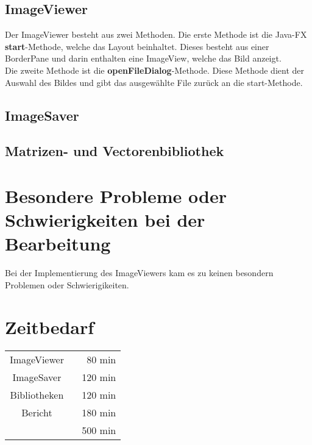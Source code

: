 \documentclass[a4paper,10pt]{ltxdoc}
\begin{document}
\subsection{ImageViewer}
Der ImageViewer besteht aus zwei Methoden. Die erste Methode ist die Java-FX \textbf{start}-Methode, welche das Layout beinhaltet. Dieses besteht aus einer BorderPane und darin enthalten eine ImageView, welche das Bild anzeigt. \\
Die zweite Methode ist die \textbf{openFileDialog}-Methode. Diese Methode dient der Auswahl des Bildes und gibt das ausgewählte File zurück an die start-Methode.
\subsection{ImageSaver}

\subsection{Matrizen- und Vectorenbibliothek}

\section{Besondere Probleme oder Schwierigkeiten bei der Bearbeitung}
Bei der Implementierung des ImageViewers kam es zu keinen besondern Problemen oder Schwierigikeiten.
\section{Zeitbedarf}
\begin{center}
\begin{tabular}{cr}
ImageViewer	  \	&80 min	\\
ImageSaver 	\	&120 min	\\
Bibliotheken \	&120 min	\\
Bericht  \		&180 min	 \\
	\hline
	&500 min
\end{tabular}
\end{center}
\end{document}

